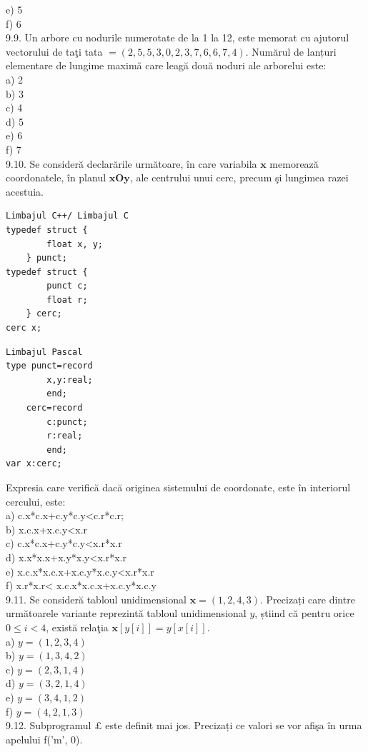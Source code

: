 e) 5
\\
f) 6
\\
9.9. Un arbore cu nodurile numerotate de la 1 la 12, este memorat cu ajutorul vectorului de taţi tata $=(2,5,5,3,0,2,3,7,6,6,7,4)$. Numărul de lanțuri elementare de lungime maximă care leagă două noduri ale arborelui este:
\\
a) 2
\\
b) 3
\\
c) 4
\\
d) 5
\\
e) 6
\\
f) 7
\\
9.10. Se consideră declarările următoare, în care variabila $\mathbf{x}$ memorează coordonatele, în planul $\mathbf{x O y}$, ale centrului unui cerc, precum şi lungimea razei acestuia.
\begin{verbatim}
Limbajul C++/ Limbajul C
typedef struct {
        float x, y;
    } punct;
typedef struct {
        punct c;
        float r;
    } cerc;
cerc x;
\end{verbatim}
\begin{verbatim}
Limbajul Pascal
type punct=record
        x,y:real;
        end;
    cerc=record
        c:punct;
        r:real;
        end;
var x:cerc;
\end{verbatim}
Expresia care verifică dacă originea sistemului de coordonate, este în interiorul cercului, este:
\\
a) c.x*c.x+c.y*c.y<c.r*c.r;
\\
b) x.c.x+x.c.y<x.r
\\
c) c.x*c.x+c.y*c.y<x.r*x.r
\\
d) x.x*x.x+x.y*x.y<x.r*x.r
\\
e) x.c.x*x.c.x+x.c.y*x.c.y<x.r*x.r
\\
f) x.r*x.r< x.c.x*x.c.x+x.c.y*x.c.y
\\
9.11. Se consideră tabloul unidimensional $\mathbf{x}=(1,2,4,3)$. Precizați care dintre următoarele variante reprezintă tabloul unidimensional $y$, știind că pentru orice $0 \leq i<4$, există relaţia $\mathbf{x}[y[i]]=y[x[i]]$.
\\
a) $y=(1,2,3,4)$
\\
b) $y=(1,3,4,2)$
\\
c) $y=(2,3,1,4)$
\\
d) $y=(3,2,1,4)$
\\
e) $y=(3,4,1,2)$
\\
f) $y=(4,2,1,3)$
\\
9.12. Subprogramul $\pounds$ este definit mai jos. Precizați ce valori se vor afişa în urma apelului f('m', 0).
